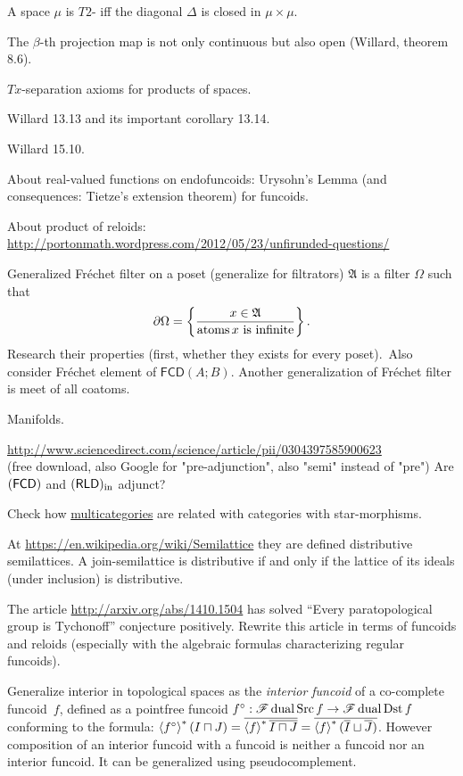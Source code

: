 \documentclass{amsart}
\begin{document}
A space $\mu$ is $T 2$- iff the diagonal $\Delta$ is closed in $\mu\times\mu$.

The $\beta$-th projection map is not only continuous but also open (Willard, theorem 8.6).

$T x$-separation axioms for products of spaces.

Willard 13.13 and its important corollary 13.14.

Willard 15.10.

About real-valued functions on endofuncoids: Urysohn's Lemma (and consequences: Tietze's extension theorem) for funcoids.

About product of reloids:\\
\url{http://portonmath.wordpress.com/2012/05/23/unfirunded-questions/}

Generalized Fr\'echet filter on a poset (generalize for filtrators) $\mathfrak{A}$ is a filter $\Omega$ such that
\[ \partial\Omega = \left\{ \frac{x\in\mathfrak{A}}{\operatorname{atoms} x\text{ is infinite}}\right\}. \]
Research their properties (first, whether they exists for every poset).\
Also consider Fr\'echet element of $\mathsf{FCD}(A;B)$.
Another generalization of Fr\'echet filter is meet of all coatoms.

Manifolds.

\url{http://www.sciencedirect.com/science/article/pii/0304397585900623}\\
(free download, also Google for "pre-adjunction", also "semi" instead of "pre") Are $(\mathsf{FCD})$ and $(\mathsf{RLD})_{\mathrm{in}}$ adjunct?

Check how \href{http://ncatlab.org/nlab/show/multicategory}{multicategories}
are related with categories with star-morphisms.

At \url{https://en.wikipedia.org/wiki/Semilattice} they are defined distributive
semilattices. A join-semilattice is distributive if and only if the lattice of its ideals (under inclusion) is distributive.

The article \url{http://arxiv.org/abs/1410.1504} has solved ``Every paratopological group is Tychonoff'' conjecture positively.
Rewrite this article in terms of funcoids and reloids (especially with the algebraic formulas characterizing regular funcoids).

Generalize interior in topological spaces as the \emph{interior funcoid} of a co-complete funcoid~$f$, defined as a pointfree funcoid
$f^\circ: \mathscr{F}\operatorname{dual}\operatorname{Src} f \rightarrow \mathscr{F}\operatorname{dual}\operatorname{Dst} f$ conforming to the formula:
$\left\langle f^{\circ}\right\rangle ^{\ast} (I \sqcap J) = \overline{\left\langle f\right\rangle ^{\ast} \overline{I \sqcap J}} = \overline{\left\langle f\right\rangle ^{\ast} ( \overline{I} \sqcup \overline{J} )}$.
However composition of an interior funcoid with a funcoid is neither a funcoid nor an interior funcoid.
It can be generalized using pseudocomplement.
\end{document}
